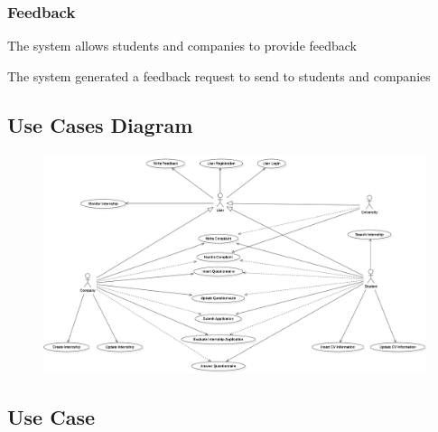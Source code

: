 \subsubsection*{Feedback}
\begin{enumerate}[label={\textbf{[R\arabic*]}}, leftmargin=1.35cm]
    \setcounter{enumi}{29}
    \item The system allows students and companies to provide feedback
    \item The system generated a feedback request to send to students and companies
\end{enumerate}


\subsection{Use Cases Diagram}
\begin{figure} [H]
    \centering
    \includegraphics[width=1\linewidth]{Use Cases Images/use_case_diagram.png}
    \label{fig: User Cases Diagram}
\end{figure}

\newpage
\subsection{Use Case}

